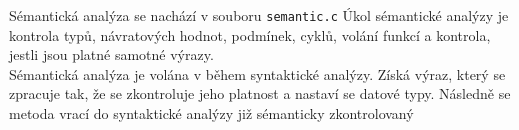 \documentclass[../main.tex]{subfiles}
\begin{document}
    Sémantická analýza se nachází v souboru \texttt{semantic.c}
    Úkol sémantické analýzy je kontrola typů, návratových hodnot, podmínek, cyklů, volání funkcí a kontrola, jestli jsou platné samotné výrazy. \\
    Sémantická analýza je volána v během syntaktické analýzy. Získá výraz, který se zpracuje tak, že se zkontroluje jeho platnost a nastaví se datové typy. Následně se metoda vrací do syntaktické analýzy již sémanticky zkontrolovaný
    \\
    

    
      
      
\end{document}
